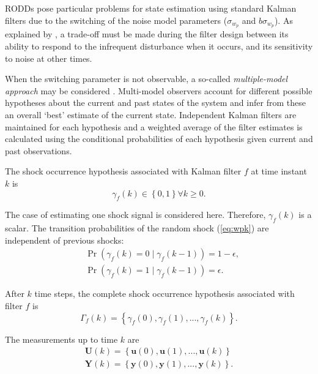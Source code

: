 RODDs pose particular problems for state estimation using standard Kalman filters due to the switching of the noise model parameters ($\sigma_{w_p}$ and $b$$\sigma_{w_p}$). As explained by \cite{robertson_detection_1995}, a trade-off must be made during the filter design between its ability to respond to the infrequent disturbance when it occurs, and its sensitivity to noise at other times.

When the switching parameter is not observable, a so-called \textit{multiple-model approach} may be considered \citep{buxbaum_recursive_1970, jaffer_estimation_1971}. Multi-model observers account for different possible hypotheses about the current and past states of the system and infer from these an overall `best' estimate of the current state. Independent Kalman filters are maintained for each hypothesis and a weighted average of the filter estimates is calculated using the conditional probabilities of each hypothesis given current and past observations. 

The shock occurrence hypothesis associated with Kalman filter $f$ at time instant $k$ is
\begin{equation} \label{eq:gammak}
	\gamma_{f}(k) \in \left\{0, 1 \right\} \forall{k \ge 0}.
\end{equation}

The case of estimating one shock signal is considered here. Therefore, $\gamma_{f}(k)$ is a scalar. The transition probabilities of the random shock (\ref{eq:wpk}) are independent of previous shocks:
\begin{equation} \label{eq:Pr_gammak_given_gammakm1}
	\begin{aligned}
		& \Pr\left(\gamma_{f}(k)=0 \mid \gamma_{f}(k-1)\right) = 1-\epsilon, \\
		& \Pr\left(\gamma_{f}(k)=1 \mid \gamma_{f}(k-1)\right) = \epsilon.
	\end{aligned}
\end{equation}

After $k$ time steps, the complete shock occurrence hypothesis associated with filter $f$ is
\begin{equation} \label{eq:Gammak}
	\Gamma_f(k) = \left\{\gamma_f(0), \gamma_f(1), ..., \gamma_f(k) \right\}.
\end{equation}

The measurements up to time $k$ are
\begin{equation} \label{eq:Uk_Yk}
	\begin{aligned}
		\mathbf{U}(k)=\left\{\mathbf{u}(0), \mathbf{u}(1), ..., \mathbf{u}(k) \right\} \\
		\mathbf{Y}(k)=\left\{\mathbf{y}(0), \mathbf{y}(1), ..., \mathbf{y}(k) \right\}.
	\end{aligned}
\end{equation}


